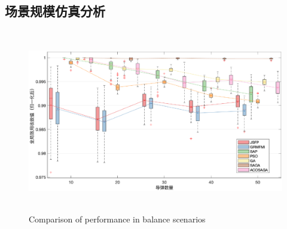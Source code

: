 \subsection{场景规模仿真分析}
\label{pg:sim:balance}


\begin{figure}[!htp]
  \centering
  \includegraphics[height=8cm]{potential_game/BalanceBox}
    {Comparison of performance in balance scenarios}
  \label{fig:balance}
\end{figure}


